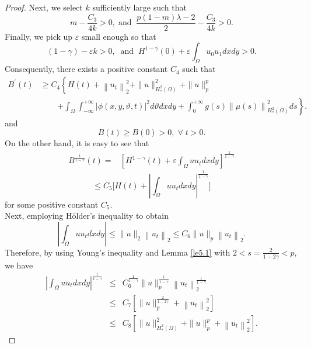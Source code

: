 \documentclass[10pt,a4paper]{amsart}
\begin{document}
\begin{proof}
Next, we select $k$ sufficiently large such that
$$m-\frac{C_{3}}{4 k}>0,\;\text{and}\;\; \frac{p(1-m)\lambda -2}{2}-\frac{C_{3}}{4k}>0.$$
Finally, we pick up $\varepsilon$ small enough so that
$$(1-\gamma) - \varepsilon k > 0,\;\;\text{and}\;\;H^{1-\gamma}(0)+\varepsilon \int_{\Omega} u_{0} u_{1} dx dy>0.
$$
Consequently, there exists a positive constant $C_4$ such that
\begin{align}\label{eq5.21}
B^{\prime}(t)&\geq C_4\left\{H(t)+\left\|u_{t}\right\|_{2}^{2}+\|u\|^{2}_{H^2_{*}(\Omega)}+\|u\|_{p}^{p}\right.\nonumber \\
&\quad\;\;\;\;\left.+\int_{\Omega} \int_{-\infty}^{+\infty}|\phi(x,y,\vartheta,t)|^{2} d\vartheta dx dy+\int_{0}^{+\infty} g(s)\left\|\mu(s)\right\|^2_{H^2_{*}(\Omega)} ds\right\}.
\end{align}
and
\begin{equation}\label{GrindEQ__66_}
B(t)\geq B(0)>0,\;\forall\;t>0.
\end{equation}
On the other hand, it is easy to see that
\begin{equation}\label{GrindEQ__67_}
\begin{aligned}
B^{\frac{1}{1-\gamma}}(t)= & \left[H^{1-\gamma}(t)+\varepsilon \int_{\Omega} u u_{t} dx dy \right]^{\frac{1}{1-\gamma}}
\end{aligned}
\end{equation}
\begin{equation}
    \leq C_5\Big[H(t)+\left|\int_{\Omega} u u_{t} dx dy\right|^{\frac{1}{1-\gamma}}\Big]
    \label{eq68}
\end{equation}
for some positive constant $C_5$.\\
Next, employing H\"{o}lder's inequality to obtain
\begin{equation*}\label{eq69}
\left| \int_{\Omega} u u_{t} dx dy \right| \leq\|u\|_{2} \left\|u_{t}\right\|_{2} \leq C_6 \|u\|_{p} \left\|u_{t}\right\|_{2}.
\end{equation*}
Therefore, by using Young's inequality and Lemma \ref{le5.1} with $2<s=\frac{2}{1-2\gamma}<p$, we have
\begin{eqnarray}\label{eq699}
\left|\int_{\Omega} u u_{t} dx dy\right|^{\frac{1}{1-\gamma}} &\leq& C^{\frac{1}{1-\gamma}}_6\|u\|_{p}^{\frac{1}{1-\gamma}} \left\|u_{t}\right\|_{2}^{\frac{1}{1-\gamma}} \nonumber\\
&\leq& C_7\left[\|u\|_{p}^{\frac{2}{1-2\gamma}}+\left\|u_{t}\right\|_{2}^2\right]\nonumber\\
&\leq& C_8 \left[ \|u\|^2_{H^2_*(\Omega)}+\|u\|_{p}^{p}+\left\|u_{t}\right\|_{2}^{2}\right].

\end{eqnarray}
\end{proof}
\end{document}
